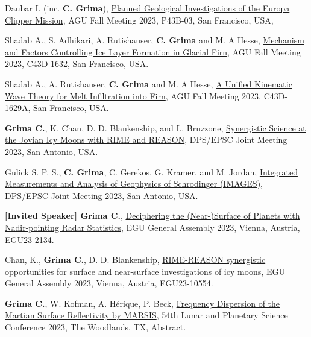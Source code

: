 \begin{etaremune}
\item
    Daubar I. (inc. \textbf{C. Grima}), \href{https://agu.confex.com/agu/fm23/meetingapp.cgi/Paper/1425641}{Planned Geological Investigations of the Europa Clipper Mission}, AGU Fall Meeting 2023, P43B-03, San Francisco, USA,

\item
    Shadab A., S. Adhikari, A. Rutishauser, \textbf{C. Grima} and M. A Hesse,  \href{https://agu.confex.com/agu/fm23/meetingapp.cgi/Paper/1276016}{Mechanism and Factors Controlling Ice Layer Formation in Glacial Firn}, AGU Fall Meeting 2023, C43D-1632, San Francisco, USA.

\item
 Shadab A., A. Rutishauser, \textbf{C. Grima} and M. A Hesse, \href{https://agu.confex.com/agu/fm23/meetingapp.cgi/Paper/1276244}{A Unified Kinematic Wave Theory for Melt Infiltration into Firn}, AGU Fall Meeting 2023, C43D-1629A, San Francisco, USA.

\item
 \textbf{Grima C.}, K. Chan, D. D. Blankenship, and L. Bruzzone, \href{https://submissions.mirasmart.com/DPS55/Itinerary/PresentationDetail.aspx?evdid=804}{Synergistic Science at the Jovian Icy Moons with RIME and REASON}, DPS/EPSC Joint Meeting 2023, San Antonio, USA.

\item
    Gulick S. P. S., \textbf{C. Grima}, C. Gerekos, G. Kramer, and M. Jordan, \href{https://submissions.mirasmart.com/DPS55/Itinerary/PresentationDetail.aspx?evdid=992}{Integrated Measurements and Analysis of Geophysics of Schrodinger (IMAGES)}, DPS/EPSC Joint Meeting 2023, San Antonio, USA.

\item
    \textbf{[Invited Speaker] Grima C.}, \href{https://meetingorganizer.copernicus.org/EGU23/EGU23-2134.html}{Deciphering the (Near-)Surface of Planets with Nadir-pointing Radar Statistics}, EGU General Assembly 2023, Vienna, Austria, EGU23-2134.

\item
    Chan, K., \textbf{Grima C.}, D. D. Blankenship, \href{https://meetingorganizer.copernicus.org/EGU23/EGU23-10554.html}{RIME-REASON synergistic opportunities for surface and near-surface investigations of icy moons}, EGU General Assembly 2023, Vienna, Austria, EGU23-10554.

\item
    \textbf{Grima C.}, W. Kofman, A. Hérique, P. Beck, \href{https://www.hou.usra.edu/meetings/lpsc2023/pdf/1120.pdf}{Frequency Dispersion of the Martian Surface Reflectivity by MARSIS}, 54th Lunar and Planetary Science Conference 2023, The Woodlands, TX, Abstract.


\end{etaremune}
